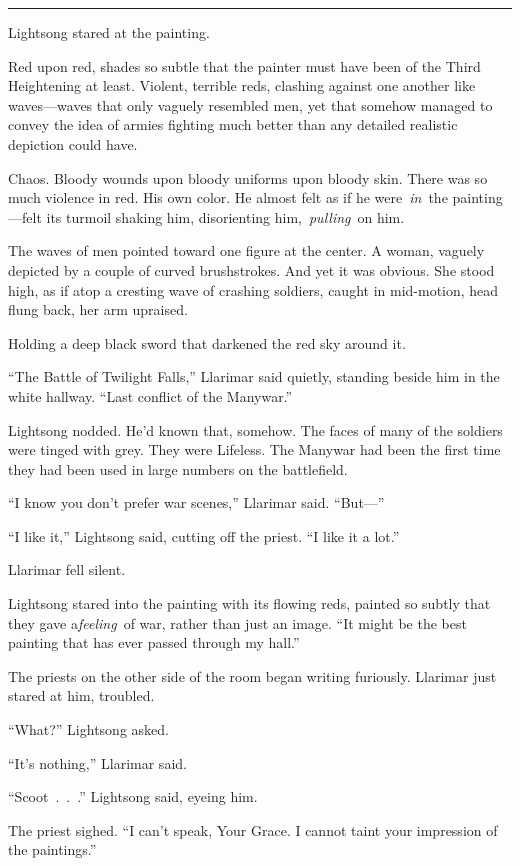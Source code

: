 \bigskip \hrule \bigskip

Lightsong stared at the painting.

Red upon red, shades so subtle that the painter must have been of the Third Heightening at least. Violent, terrible reds, clashing against one another like waves—waves that only vaguely resembled men, yet that somehow managed to convey the idea of armies fighting much better than any detailed realistic depiction could have.

Chaos. Bloody wounds upon bloody uniforms upon bloody skin. There was so much violence in red. His own color. He almost felt as if he were~\textit{in}~the painting—felt its turmoil shaking him, disorienting him,~\textit{pulling}~on him.

The waves of men pointed toward one figure at the center. A woman, vaguely depicted by a couple of curved brushstrokes. And yet it was obvious. She stood high, as if atop a cresting wave of crashing soldiers, caught in mid-motion, head flung back, her arm upraised.

Holding a deep black sword that darkened the red sky around it.

“The Battle of Twilight Falls,” Llarimar said quietly, standing beside him in the white hallway. “Last conflict of the Manywar.”

Lightsong nodded. He’d known that, somehow. The faces of many of the soldiers were tinged with grey. They were Lifeless. The Manywar had been the first time they had been used in large numbers on the battlefield.

“I know you don’t prefer war scenes,” Llarimar said. “But—”

“I like it,” Lightsong said, cutting off the priest. “I like it a lot.”

Llarimar fell silent.

Lightsong stared into the painting with its flowing reds, painted so subtly that they gave a\textit{feeling}~of war, rather than just an image. “It might be the best painting that has ever passed through my hall.”

The priests on the other side of the room began writing furiously. Llarimar just stared at him, troubled.

“What?” Lightsong asked.

“It’s nothing,” Llarimar said.

“Scoot~.~.~.” Lightsong said, eyeing him.

The priest sighed. “I can’t speak, Your Grace. I cannot taint your impression of the paintings.”

